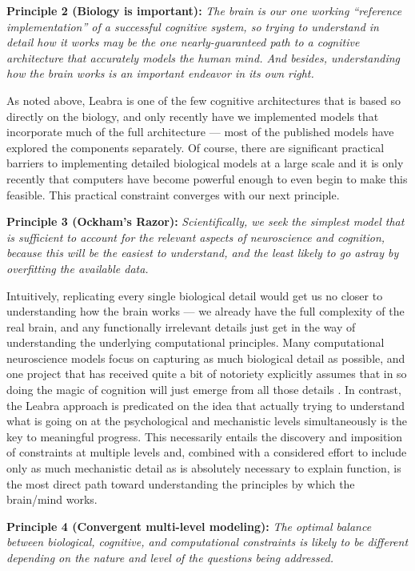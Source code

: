\documentclass[11pt,twoside]{article}
\begin{document}
{\bf Principle 2 (Biology is important):} {\em The brain is our one working
  ``reference implementation'' of a successful cognitive system, so trying to
  understand in detail how it works may be the one nearly-guaranteed path to a
  cognitive architecture that accurately models the human mind.  And besides, understanding how the brain
  works is an important endeavor in its own right. }

As noted above, Leabra is one of the few cognitive architectures that is based
so directly on the biology, and only recently have we implemented models that
incorporate much of the full architecture --- most of the published models
have explored the components separately.  Of course, there are significant
practical barriers to implementing detailed biological models at a large scale
and it is only recently that computers have become powerful enough to even
begin to make this feasible.  This practical constraint converges with our
next principle.

{\bf Principle 3 (Ockham's Razor):} {\em Scientifically, we seek the simplest
  model that is sufficient to account for the relevant aspects of neuroscience
  and cognition, because this will be the easiest to understand, and the least
  likely to go astray by overfitting the available data.}

Intuitively, replicating every single biological detail would get us no closer
to understanding how the brain works --- we already have the full complexity
of the real brain, and any functionally irrelevant details just get in the way
of understanding the underlying computational principles.  Many computational
neuroscience models focus on capturing as much biological detail as possible,
and one project that has received quite a bit of notoriety explicitly assumes
that in so doing the magic of cognition will just emerge from all those
details \cite{MarkramBlueBrain}.  In contrast, the Leabra approach is
predicated on the idea that actually trying to understand what is going on at
the psychological and mechanistic levels simultaneously is the key to
meaningful progress. This necessarily entails the discovery and imposition of
constraints at multiple levels and, combined with a considered effort to
include only as much mechanistic detail as is absolutely necessary to explain
function, is the most direct path toward understanding the principles by which
the brain/mind works.

{\bf Principle 4 (Convergent multi-level modeling):} {\em The optimal balance
  between biological, cognitive, and computational constraints is likely to be
  different depending on the nature and level of the questions being
  addressed.}  
\end{document}

